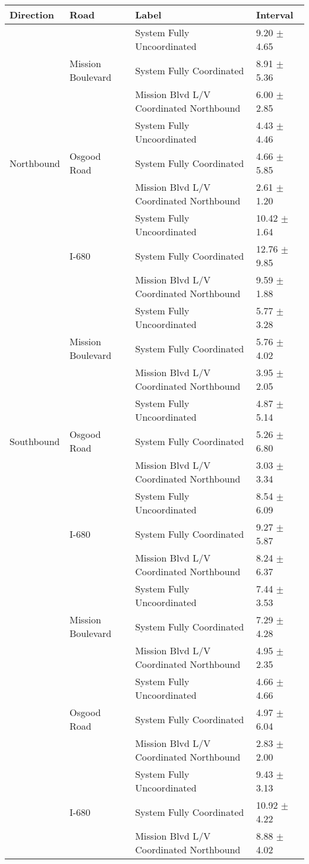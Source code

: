 \begin{tabular}{llll}
\toprule
Direction & Road & Label & Interval \\
\midrule
\multirow[t]{9}{*}{Northbound} & \multirow[t]{3}{*}{Mission Boulevard} & System Fully Uncoordinated & 9.20 $\pm$ 4.65 \\
 &  & System Fully Coordinated & 8.91 $\pm$ 5.36 \\
 &  & Mission Blvd L/V Coordinated Northbound & 6.00 $\pm$ 2.85 \\
 & \multirow[t]{3}{*}{Osgood Road} & System Fully Uncoordinated & 4.43 $\pm$ 4.46 \\
 &  & System Fully Coordinated & 4.66 $\pm$ 5.85 \\
 &  & Mission Blvd L/V Coordinated Northbound & 2.61 $\pm$ 1.20 \\
 & \multirow[t]{3}{*}{I-680} & System Fully Uncoordinated & 10.42 $\pm$ 1.64 \\
 &  & System Fully Coordinated & 12.76 $\pm$ 9.85 \\
 &  & Mission Blvd L/V Coordinated Northbound & 9.59 $\pm$ 1.88 \\
\multirow[t]{9}{*}{Southbound} & \multirow[t]{3}{*}{Mission Boulevard} & System Fully Uncoordinated & 5.77 $\pm$ 3.28 \\
 &  & System Fully Coordinated & 5.76 $\pm$ 4.02 \\
 &  & Mission Blvd L/V Coordinated Northbound & 3.95 $\pm$ 2.05 \\
 & \multirow[t]{3}{*}{Osgood Road} & System Fully Uncoordinated & 4.87 $\pm$ 5.14 \\
 &  & System Fully Coordinated & 5.26 $\pm$ 6.80 \\
 &  & Mission Blvd L/V Coordinated Northbound & 3.03 $\pm$ 3.34 \\
 & \multirow[t]{3}{*}{I-680} & System Fully Uncoordinated & 8.54 $\pm$ 6.09 \\
 &  & System Fully Coordinated & 9.27 $\pm$ 5.87 \\
 &  & Mission Blvd L/V Coordinated Northbound & 8.24 $\pm$ 6.37 \\
\multirow[t]{9}{*}{} & \multirow[t]{3}{*}{Mission Boulevard} & System Fully Uncoordinated & 7.44 $\pm$ 3.53 \\
 &  & System Fully Coordinated & 7.29 $\pm$ 4.28 \\
 &  & Mission Blvd L/V Coordinated Northbound & 4.95 $\pm$ 2.35 \\
 & \multirow[t]{3}{*}{Osgood Road} & System Fully Uncoordinated & 4.66 $\pm$ 4.66 \\
 &  & System Fully Coordinated & 4.97 $\pm$ 6.04 \\
 &  & Mission Blvd L/V Coordinated Northbound & 2.83 $\pm$ 2.00 \\
 & \multirow[t]{3}{*}{I-680} & System Fully Uncoordinated & 9.43 $\pm$ 3.13 \\
 &  & System Fully Coordinated & 10.92 $\pm$ 4.22 \\
 &  & Mission Blvd L/V Coordinated Northbound & 8.88 $\pm$ 4.02 \\
\bottomrule
\end{tabular}
